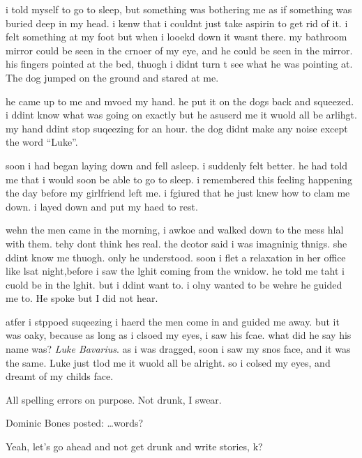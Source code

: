 i told myself to go to sleep, but something was bothering me as if
something was buried deep in my head. i kenw that i couldnt just
take aspirin to get rid of it. i felt something at my foot but when
i looekd down it wasnt there. my bathroom mirror could be seen in
the crnoer of my eye, and he could be seen in the mirror. his
fingers pointed at the bed, thuogh i didnt turn t see what he was
pointing at. The dog jumped on the ground and stared at me.



he came up to me and mvoed my hand. he put it on the dogs back and
squeezed. i ddint know what was going on exactly but he asuserd me
it wuold all be arlihgt. my hand ddint stop suqeezing for an hour.
the dog didnt make any noise except the word ``Luke''.



soon i had began laying down and fell asleep. i suddenly felt
better. he had told me that i would soon be able to go to sleep. i
remembered this feeling happening the day before my girlfriend left
me. i fgiured that he just knew how to clam me down. i layed down
and put my haed to rest.



wehn the men came in the morning, i awkoe and walked down to the
mess hlal with them. tehy dont think hes real. the dcotor said i
was imagninig thnigs. she ddint know me thuogh. only he understood.
soon i flet a relaxation in her office like lsat night,before i saw
the lghit coming from the wnidow. he told me taht i cuold be in the
lghit. but i ddint want to. i olny wanted to be wehre he guided me
to. He spoke but I did not hear.



atfer i stppoed suqeezing i haerd the men come in and guided me
away. but it was oaky, because as long as i clsoed my eyes, i saw
his fcae. what did he say his name was? {\em Luke Bavarius}. as i
was dragged, soon i saw my snos face, and it was the same. Luke
just tlod me it wuold all be alright. so i colsed my eyes, and
dreamt of my childs face.



  All
spelling errors on purpose. Not drunk, I swear.   

 






Dominic Bones posted:
{\ldots}words?




Yeah, let's go ahead and not get drunk and write stories, k? 

 



